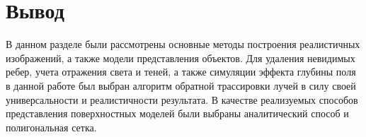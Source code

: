 \section*{Вывод}

В данном разделе были рассмотрены основные методы построения реалистичных изображений, а также модели представления объектов. Для удаления невидимых ребер, учета отражения света и теней, а также симуляции эффекта глубины поля в данной работе был выбран алгоритм обратной трассировки лучей в силу своей универсальности и реалистичности результата. В качестве реализуемых способов представления поверхностных моделей были выбраны аналитический способ и полигональная сетка.

\clearpage
